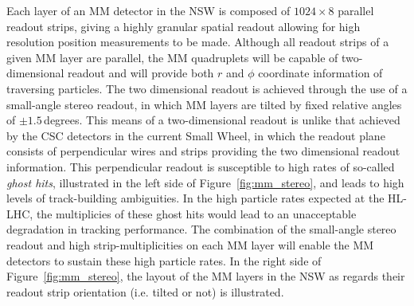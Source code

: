 Each layer of an MM detector in the NSW is composed of $1024 \times 8$ parallel readout strips, giving
a highly granular spatial readout allowing for high resolution position measurements to be made.
Although all readout strips of a given MM layer are parallel, the MM quadruplets will be capable
of two-dimensional readout and will provide both $r$ and $\phi$ coordinate information
of traversing particles.
The two dimensional readout is achieved through the use of a small-angle stereo readout, in which
MM layers are tilted by fixed relative angles of $\pm 1.5$\,degrees.
This means of a two-dimensional readout is unlike that achieved by the CSC detectors in the current
Small Wheel, in which the readout plane consists of perpendicular wires and strips providing
the two dimensional readout information.
This perpendicular readout is susceptible to high rates of so-called \textit{ghost hits},
illustrated in the left side of Figure~\ref{fig:mm_stereo}, and leads to high levels of track-building ambiguities.
In the high particle rates expected at the HL-LHC, the multiplicies of these ghost hits would
lead to an unacceptable degradation in tracking performance.
The combination of the small-angle stereo readout and high strip-multiplicities on each MM layer will
enable the MM detectors to sustain these high particle rates.
In the right side of Figure~\ref{fig:mm_stereo}, the layout of the MM layers in the NSW as regards
their readout strip orientation (i.e. tilted or not) is illustrated.

